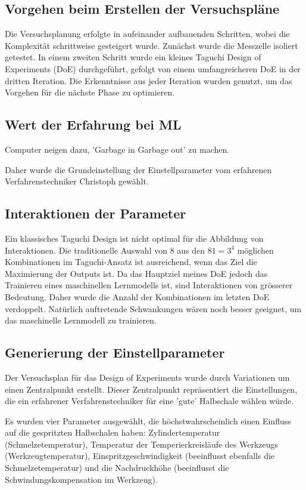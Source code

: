 
\subsection{Vorgehen beim Erstellen der Versuchspläne}

Die Versuchsplanung erfolgte in aufeinander aufbauenden Schritten, wobei die Komplexität schrittweise gesteigert wurde. Zunächst wurde die Messzelle isoliert getestet. In einem zweiten Schritt wurde ein kleines Taguchi Design of Experiments (DoE) durchgeführt, gefolgt von einem umfangreicheren DoE in der dritten Iteration. Die Erkenntnisse aus jeder Iteration wurden genutzt, um das Vorgehen für die nächste Phase zu optimieren.
\subsection{Wert der Erfahrung bei ML}
Computer neigen dazu, 'Garbage in Garbage out' zu machen.

Daher wurde die Grundeinstellung der Einstellparameter vom erfahrenen Verfahrenstechniker Christoph gewählt. 


\subsection{Interaktionen der Parameter}

Ein klassisches Taguchi Design ist nicht optimal für die Abbildung von Interaktionen. Die traditionelle Auswahl von 8 aus den $81 = 3^4$ möglichen Kombinationen im Taguchi-Ansatz ist ausreichend, wenn das Ziel die Maximierung der Outputs ist. Da das Hauptziel meines DoE jedoch das Trainieren eines maschinellen Lernmodells ist, sind Interaktionen von grösserer Bedeutung. Daher wurde die Anzahl der Kombinationen im letzten DoE verdoppelt. Natürlich auftretende Schwankungen wären noch besser geeignet, um das maschinelle Lernmodell zu trainieren.



\subsection{Generierung der Einstellparameter}

Der Versuchsplan für das Design of Experiments wurde durch Variationen um einen Zentralpunkt erstellt. Dieser Zentralpunkt repräsentiert die Einstellungen, die ein erfahrener Verfahrenstechniker für eine 'gute' Halbschale wählen würde.

Es wurden vier Parameter ausgewählt, die höchstwahrscheinlich einen Einfluss auf die gespritzten Halbschalen haben: Zylindertemperatur (Schmelzetemperatur), Temperatur der Temperierkreisläufe des Werkzeugs (Werkzeugtemperatur), Einspritzgeschwindigkeit (beeinflusst ebenfalls die Schmelzetemperatur) und die Nachdruckhöhe (beeinflusst die Schwindungskompensation im Werkzeug).

